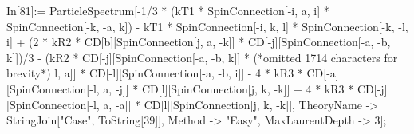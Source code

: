 In[81]:= ParticleSpectrum[-1/3 * (kT1 * SpinConnection[-i, a, i] * SpinConnection[-k, -a, k]) - kT1 * SpinConnection[-i, k, l] * SpinConnection[-k, -l, i] + (2 * kR2 * CD[b][SpinConnection[j, a, -k]] * CD[-j][SpinConnection[-a, -b, k]])/3 - (kR2 * CD[-j][SpinConnection[-a, -b, k]] * (*omitted 1714 characters for brevity*) l, a]] * CD[-l][SpinConnection[-a, -b, i]] - 4 * kR3 * CD[-a][SpinConnection[-l, a, -j]] * CD[l][SpinConnection[j, k, -k]] + 4 * kR3 * CD[-j][SpinConnection[-l, a, -a]] * CD[l][SpinConnection[j, k, -k]], TheoryName -> StringJoin["Case", ToString[39]], Method -> "Easy", MaxLaurentDepth -> 3];